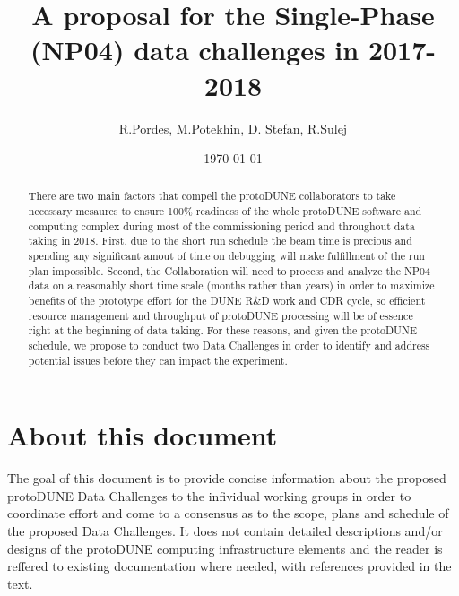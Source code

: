 \documentclass[pdftex,12pt,letter]{article}
\title{A proposal for the Single-Phase \pd (NP04) data challenges in 2017-2018}
\date{\today}
\author{R.Pordes, M.Potekhin, D. Stefan, R.Sulej}
\newcommand{\pd}{protoDUNE\xspace}
\begin{document}

\maketitle

\begin{abstract}
\noindent There are two main factors that compell the \pd collaborators to take necessary mesaures
to ensure 100\% readiness of the whole \pd software and computing complex during most of the
commissioning period and throughout data taking in 2018. First, due to the short run schedule the beam
time is precious and spending any significant amout of time on debugging will make fulfillment of
the run plan impossible. Second, the Collaboration will need to process and analyze the NP04 data
on a reasonably short time scale (months rather than years) in order to maximize benefits of the
prototype effort for the DUNE R\&D work and CDR cycle, so efficient resource management and
throughput of \pd processing will be of essence right at the beginning of data taking. For these
reasons, and given the \pd schedule,  we propose to conduct two Data Challenges in order to identify
and address potential issues before they can impact the experiment.



\end{abstract}

\tableofcontents

\pagebreak

\section{About this document}
The goal of this document is to provide concise information about the proposed \pd Data Challenges
to the infividual working groups in order to coordinate effort and come to a consensus as to the scope,
plans and schedule of the proposed Data Challenges. It does not contain detailed descriptions
and/or designs of the \pd computing
infrastructure elements and the reader is reffered to existing documentation where
needed, with references provided in the text.
\end{document}
